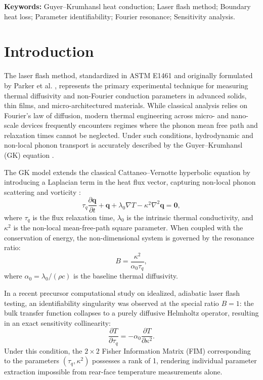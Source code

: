 \documentclass[review,12pt]{article}
\begin{document}
\textbf{Keywords:} Guyer--Krumhansl heat conduction; Laser flash method; Boundary heat loss; Parameter identifiability; Fourier resonance; Sensitivity analysis.

\newpage

\section{Introduction}

The laser flash method, standardized in ASTM E1461 \cite{astm2013standard} and originally formulated by Parker et al. \cite{parker1961flash}, represents the primary experimental technique for measuring thermal diffusivity and non-Fourier conduction parameters in advanced solids, thin films, and micro-architectured materials. While classical analysis relies on Fourier's law of diffusion, modern thermal engineering across micro- and nano-scale devices frequently encounters regimes where the phonon mean free path and relaxation times cannot be neglected. Under such conditions, hydrodynamic and non-local phonon transport is accurately described by the Guyer--Krumhansl (GK) equation \cite{guyer1966solution,guyer1966thermal,kovacs2018analytic,sellitto2025nonlinear}.

The GK model extends the classical Cattaneo--Vernotte hyperbolic equation by introducing a Laplacian term in the heat flux vector, capturing non-local phonon scattering and vorticity \cite{van2017galilean,zhu2017nonlocal}:
\begin{equation}
\tau_q \frac{\partial \bm{q}}{\partial t} + \bm{q} + \lambda_0 \nabla T - \kappa^2 \nabla^2 \bm{q} = \bm{0},
\label{eq:gk_dimensional}
\end{equation}
where $\tau_q$ is the flux relaxation time, $\lambda_0$ is the intrinsic thermal conductivity, and $\kappa^2$ is the non-local mean-free-path square parameter. When coupled with the conservation of energy, the non-dimensional system is governed by the resonance ratio:
\begin{equation}
B = \frac{\kappa^2}{\alpha_0 \tau_q},
\label{eq:B_ratio}
\end{equation}
where $\alpha_0 = \lambda_0 / (\rho c)$ is the baseline thermal diffusivity.

In a recent precursor computational study on idealized, adiabatic laser flash testing, an identifiability singularity was observed at the special ratio $B = 1$: the bulk transfer function collapses to a purely diffusive Helmholtz operator, resulting in an exact sensitivity collinearity:
\begin{equation}
\frac{\partial T}{\partial \tau_q} = -\alpha_0 \frac{\partial T}{\partial \kappa^2}.
\label{eq:collinearity_intro}
\end{equation}
Under this condition, the $2 \times 2$ Fisher Information Matrix (FIM) corresponding to the parameters $(\tau_q, \kappa^2)$ possesses a rank of 1, rendering individual parameter extraction impossible from rear-face temperature measurements alone.
\end{document}
